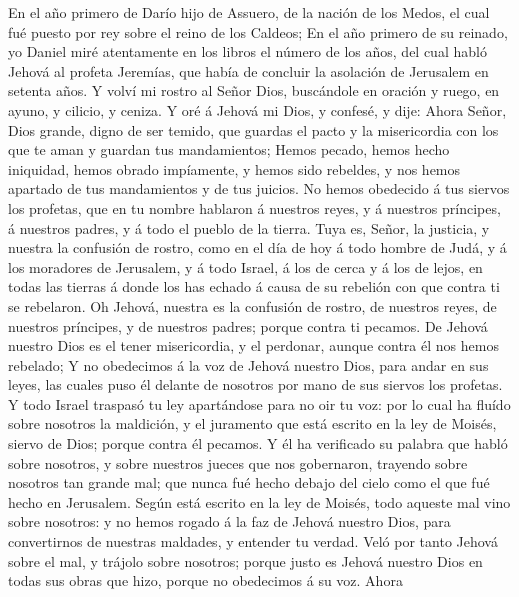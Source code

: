  En el año primero de Darío hijo de Assuero, de la nación
de los Medos, el cual fué puesto por rey sobre el reino de los Caldeos;
 En el año primero de su reinado, yo Daniel miré
atentamente en los libros el número de los años, del cual habló Jehová
al profeta Jeremías, que había de concluir la asolación de Jerusalem en
setenta años.  Y volví mi rostro al Señor Dios, buscándole
en oración y ruego, en ayuno, y cilicio, y ceniza.  Y oré
á Jehová mi Dios, y confesé, y dije: Ahora Señor, Dios grande, digno de
ser temido, que guardas el pacto y la misericordia con los que te aman y
guardan tus mandamientos;  Hemos pecado, hemos hecho
iniquidad, hemos obrado impíamente, y hemos sido rebeldes, y nos hemos
apartado de tus mandamientos y de tus juicios.  No hemos
obedecido á tus siervos los profetas, que en tu nombre hablaron á
nuestros reyes, y á nuestros príncipes, á nuestros padres, y á todo el
pueblo de la tierra.  Tuya es, Señor, la justicia, y
nuestra la confusión de rostro, como en el día de hoy á todo hombre de
Judá, y á los moradores de Jerusalem, y á todo Israel, á los de cerca y
á los de lejos, en todas las tierras á donde los has echado á causa de
su rebelión con que contra ti se rebelaron.  Oh Jehová,
nuestra es la confusión de rostro, de nuestros reyes, de nuestros
príncipes, y de nuestros padres; porque contra ti pecamos.
 De Jehová nuestro Dios es el tener misericordia, y el
perdonar, aunque contra él nos hemos rebelado;  Y no
obedecimos á la voz de Jehová nuestro Dios, para andar en sus leyes, las
cuales puso él delante de nosotros por mano de sus siervos los profetas.
 Y todo Israel traspasó tu ley apartándose para no oir tu
voz: por lo cual ha fluído sobre nosotros la maldición, y el juramento
que está escrito en la ley de Moisés, siervo de Dios; porque contra él
pecamos.  Y él ha verificado su palabra que habló sobre
nosotros, y sobre nuestros jueces que nos gobernaron, trayendo sobre
nosotros tan grande mal; que nunca fué hecho debajo del cielo como el
que fué hecho en Jerusalem.  Según está escrito en la ley
de Moisés, todo aqueste mal vino sobre nosotros: y no hemos rogado á la
faz de Jehová nuestro Dios, para convertirnos de nuestras maldades, y
entender tu verdad.  Veló por tanto Jehová sobre el mal,
y trájolo sobre nosotros; porque justo es Jehová nuestro Dios en todas
sus obras que hizo, porque no obedecimos á su voz.  Ahora
